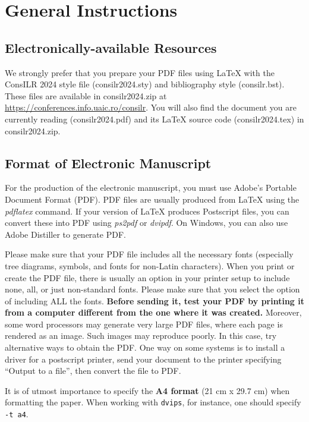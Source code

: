 \documentclass[11pt]{article}
\begin{document}
\section{General Instructions}
\subsection{Electronically-available Resources}



We strongly prefer that you prepare your PDF files using \LaTeX{} with
the ConsILR 2024 style file (consilr2024.sty) and bibliography style
(consilr.bst). These files are available in consilr2024.zip
at \url{https://conferences.info.uaic.ro/consilr}.
You will also find the document
you are currently reading (consilr2024.pdf) and its \LaTeX{} source code
(consilr2024.tex) in consilr2024.zip.


\subsection{Format of Electronic Manuscript}
\label{sect:pdf}

For the production of the electronic manuscript, you must use Adobe's
Portable Document Format (PDF). PDF files are usually produced from
\LaTeX{} using the \textit{pdflatex} command. If your version of
\LaTeX{} produces Postscript files, you can convert these into PDF
using \textit{ps2pdf} or \textit{dvipdf}. On Windows, you can also use
Adobe Distiller to generate PDF.

Please make sure that your PDF file includes all the necessary fonts
(especially tree diagrams, symbols, and fonts for non-Latin characters).
When you print or create the PDF file, there is usually
an option in your printer setup to include none, all, or just
non-standard fonts.  Please make sure that you select the option of
including ALL the fonts. \textbf{Before sending it, test your PDF by
  printing it from a computer different from the one where it was
  created.} Moreover, some word processors may generate very large PDF
files, where each page is rendered as an image. Such images may
reproduce poorly. In this case, try alternative ways to obtain the
PDF. One way on some systems is to install a driver for a postscript
printer, send your document to the printer specifying ``Output to a
file'', then convert the file to PDF.

It is of utmost importance to specify the \textbf{A4 format} (21 cm
x 29.7 cm) when formatting the paper. When working with
{\tt dvips}, for instance, one should specify {\tt -t a4}.
\end{document}
